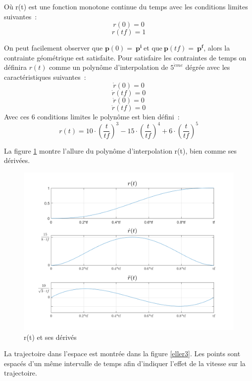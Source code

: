 \documentclass{article} %
\begin{document}
O\`{u} r(t) est une fonction monotone continue du temps avec les conditions limites suivantes~:
$$ r(0)=0 $$
$$ r(tf)=1 $$

On peut facilement observer que $\boldsymbol{p}\left(0\right)=\ {\boldsymbol{p}}^{\boldsymbol{i}}\ $et que$\ \boldsymbol{p}\left(tf\right)=\ {\boldsymbol{p}}^{\boldsymbol{f}}$, alors la contrainte g\'{e}om\'{e}trique est satisfaite. Pour satisfaire les contraintes de temps on d\'{e}finira $r\left(t\right)$ comme un polyn\^{o}me d'interpolation de ${5}^{\grave{e}me}$ d\'{e}gr\'{e}e avec les caract\'{e}ristiques suivantes~:
\[\dot{r}\left(0\right)= 0\] 
\[\dot{r}\left(tf\right)= 0\] 
\[\ddot{r}\left(0\right)= 0\] 
\[\ddot{r}\left(tf\right)= 0\] 
Avec ces 6 conditions limites le polyn\^{o}me est bien d\'{e}fini~:
\[r\left(t\right)=10 \cdot {\left(\frac{t}{tf}\right)}^3-15 \cdot {\left(\frac{t}{tf}\right)}^4+6 \cdot {\left(\frac{t}{tf}\right)}^5\]

La figure \ref{eller2} montre l'allure du polyn\^{o}me d'interpolation r(t), bien comme ses d\'{e}riv\'{e}es.

\begin{figure}[h]	%
	\includegraphics[width=\textwidth]{TrajFig2.png}
	\caption{r(t) et ses d\'{e}riv\'{e}s}
	\label{eller2}
\end{figure}

La trajectoire dans l'espace est montr\'{e}e dans la figure \ref{eller3}. Les points sont espac\'{e}s d'un m\^{e}me intervalle de temps afin d'indiquer l'effet de la vitesse sur la trajectoire.
\end{document}
